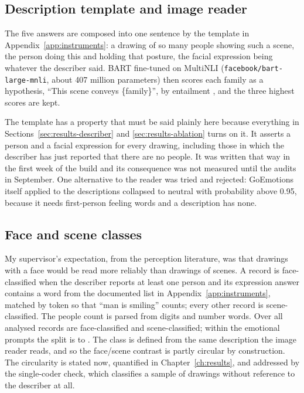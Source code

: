 \subsection{Description template and image reader}

The five answers are composed into one sentence by the template in Appendix~\ref{app:instruments}: a drawing of so many people showing such a scene, the person doing this and holding that posture, the facial expression being whatever the describer said. BART fine-tuned on MultiNLI \cite{lewis2020bart, williams2018broad} (\texttt{facebook/bart-large-mnli}, about 407 million parameters) then scores each family as a hypothesis, ``This scene conveys \{family\}'', by entailment \cite{yin2019benchmarking}, and the three highest scores are kept.

The template has a property that must be said plainly here because everything in Sections~\ref{sec:results-describer} and \ref{sec:results-ablation} turns on it. It asserts a person and a facial expression for every drawing, including those in which the describer has just reported that there are no people. It was written that way in the first week of the build and its consequence was not measured until the audits in September. One alternative to the reader was tried and rejected: GoEmotions itself applied to the descriptions collapsed to neutral with probability above 0.95, because it needs first-person feeling words and a description has none.

\subsection{Face and scene classes}

My supervisor's expectation, from the perception literature, was that drawings with a face would be read more reliably than drawings of scenes. A record is face-classified when the describer reports at least one person and its expression answer contains a word from the documented list in Appendix~\ref{app:instruments}, matched by token so that ``man is smiling'' counts; every other record is scene-classified. The people count is parsed from digits and number words. Over all analysed records \nFaceAll{} are face-classified and \nSceneAll{} scene-classified; within the emotional prompts the split is \nFaceEmo{} to \nSceneEmo{}. The class is defined from the same description the image reader reads, and so the face/scene contrast is partly circular by construction. The circularity is stated now, quantified in Chapter~\ref{ch:results}, and addressed by the single-coder check, which classifies a sample of drawings without reference to the describer at all.

